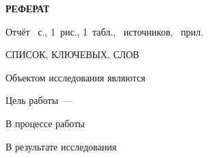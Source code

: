 \begin{center}
  \Large{\textbf{РЕФЕРАТ}}
\end{center}

Отчёт ~с., 1~рис., 1~табл.,
~источников, ~прил.

СПИСОК, КЛЮЧЕВЫХ, СЛОВ

Объектом исследования являются

Цель работы~--- 

В процессе работы

В результате исследования
\newpage
